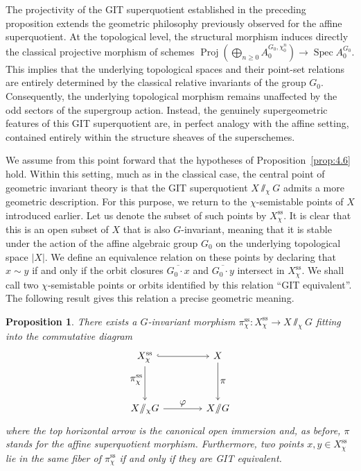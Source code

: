 \documentclass[11pt,a4paper,reqno,noamsfonts]{amsart}
\numberwithin{equation}{section}
\newtheorem{proposition}[theorem]{Proposition}
\theoremstyle{definition}
\theoremstyle{remark}
\newcommand{\uss}{\ensuremath{\mathrm{ss}}}
\DeclareMathOperator{\Spec}{Spec}
\DeclareMathOperator{\Proj}{Proj}
\begin{document}
The projectivity of the GIT superquotient established in the preceding proposition extends the geometric philosophy previously observed for the affine superquotient. At the topological level, the structural morphism induces directly the classical projective morphism of schemes $\Proj (\bigoplus_{n \geq 0} A_0^{G_0, \chi_0^n}) \to \Spec A_0^{G_0}$. This implies that the underlying topological spaces and their point-set relations are entirely determined by the classical relative invariants of the group $G_{0}$. Consequently, the underlying topological morphism remains unaffected by the odd sectors of the supergroup action. Instead, the genuinely supergeometric features of this GIT superquotient are, in perfect analogy with the affine setting, contained entirely within the structure sheaves of the superschemes.

We assume from this point forward that the hypotheses of Proposition~\ref{prop:4.6} hold. Within this setting, much as in the classical case, the central point of geometric invariant theory is that the GIT superquotient $X {\sslash_{\chi}} G$ admits a more geometric description. For this purpose, we return to the $\chi$-semistable points of $X$ introduced earlier. Let us denote the subset of such points by $X_{\chi }^{\uss}$. It is clear that this is an open subset of $X$ that is also $G$-invariant, meaning that it is stable under the action of the affine algebraic group $G_{0}$ on the underlying topological space $\lvert X \rvert$. We define an equivalence relation on these points by declaring that $x \sim y$ if and only if the orbit closures $\overline{G_0 \cdot x}$ and $\overline{G_0 \cdot y}$ intersect in $X_{\chi }^{\uss}$. We shall call two $\chi$-semistable points or orbits identified by this relation ``GIT equivalent''. The following result gives this relation a precise geometric meaning.

\begin{proposition}\label{prop:4.7}
There exists a $G$-invariant morphism $\pi^{\uss}_{\chi}\colon X^{\text{ss}}_{\chi} \to X \sslash_{\chi} G$ fitting into the commutative diagram
\begin{equation}
\begin{tikzcd}[row sep=3.5em,  
column sep=4.0em,
  every label/.append style={font=\normalsize}
]
X^{\uss}_{\chi} \arrow[r, -{To[length=2.5pt, width=4pt]}, hook]  \arrow[d, -{To[length=2.5pt, width=4pt]}, "\pi^{\uss}_{\chi}"'{yshift=3.5pt}]  & X   \arrow[d, -{To[length=2.5pt, width=4pt]}, "\pi"] \\
X {\sslash_{\chi}} G \arrow[r, -{To[length=2.5pt, width=4pt]}, "\varphi"] & X {\sslash} G
\end{tikzcd}
\end{equation}
where the top horizontal arrow is the canonical open immersion and, as before, $\pi$ stands for the affine superquotient morphism. Furthermore, two points $x, y \in X^{\text{ss}}_{\chi}$ lie in the same fiber of $\pi^{\uss}_{\chi}$ if and only if they are GIT equivalent.
\end{proposition}
\end{document}
